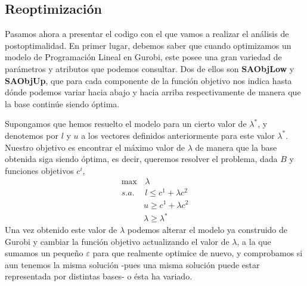 \documentclass[twoside,a4paper,openright,12pt,tikz]{book}
\begin{document}
\subsection{Reoptimización}
Pasamos ahora a presentar el codigo con el que vamos a realizar el análisis de postoptimalidad. En primer lugar, debemos saber que cuando optimizamos un modelo de Programación Lineal en Gurobi, este posee una gran variedad de parámetros y atributos que podemos consultar. Dos de ellos son \textbf{SAObjLow }y \textbf{SAObjUp}, que para cada componente de la función objetivo nos indica hasta dónde podemos variar hacia abajo y hacia arriba respectivamente de manera que la base continúe siendo óptima. 

 Supongamos que hemos resuelto el modelo para un cierto valor de $\lambda^*$, y denotemos por $l$ y $u$ a los vectores definidos anteriormente para este valor $\lambda^*$. Nuestro objetivo es encontrar el máximo valor de $\lambda$ de manera que la base obtenida siga siendo óptima, es decir, queremos resolver el problema, dada $B$ y funciones objetivos $c^i$, 
\begin{align*}
\max&\, \lambda\\
s.a.&\,  l \leq c^1 + \lambda c^2\\
& u \geq c^1 + \lambda c^2 \\
& \lambda\geq \lambda^* 
\end{align*}
Una vez obtenido este valor de $\lambda$ podemos alterar el modelo ya construido de Gurobi y cambiar la función objetivo actualizando el valor de $\lambda$, a la que sumamos un pequeño $\varepsilon$ para que realmente optimice de nuevo, y comprobamos si aun tenemos la misma solución -pues una misma solución puede estar representada por distintas bases- o ésta ha variado. 
\end{document}
